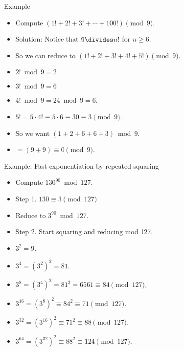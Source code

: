 \documentclass{beamer}
\begin{document}
\begin{frame}{Example}
\begin{itemize}
  \item Compute $(1! + 2! + 3! + \cdots + 100!) \pmod 9$.
  \item Solution: Notice that $9\divides n!$ for $n\geq 6$.
  \item So we can reduce to $(1! + 2! + 3! + 4! + 5!) \pmod 9$.
  \item $2! \bmod 9 = 2$
  \item $3! \bmod 9 = 6$
  \item $4! \bmod 9 = 24 \bmod 9 = 6$.
  \item $5! = 5 \cdot 4! \equiv 5 \cdot 6 \equiv 30 \equiv 3 \pmod 9$.
  \item So we want $(1 + 2 + 6 + 6 + 3) \bmod 9$.
  \item $=(9+9) \equiv 0 \pmod 9$.
\end{itemize}
\end{frame}


\begin{frame}{Example: Fast exponentiation by repeated squaring}
\begin{itemize}
  \item Compute $130^{90} \bmod 127$.
  \item Step 1. $130 \equiv 3 \pmod {127}$
  \item Reduce to $3^{90} \bmod 127$.
  \item Step 2. Start squaring and reducing mod 127.
  \item $3^2 = 9$.
  \item $3^4 = (3^2)^2 = 81$.
  \item $3^{8} = (3^4)^2 = 81^2 = 6561   \equiv 84  \pmod {127}$.
  \item $3^{16} = (3^{8})^2 \equiv 84^2  \equiv 71  \pmod {127}$.
  \item $3^{32} = (3^{16})^2 \equiv 71^2 \equiv 88  \pmod {127}$.
  \item $3^{64} = (3^{32})^2 \equiv 88^2 \equiv 124 \pmod {127}$.
\end{itemize}
\end{frame}
\end{document}

